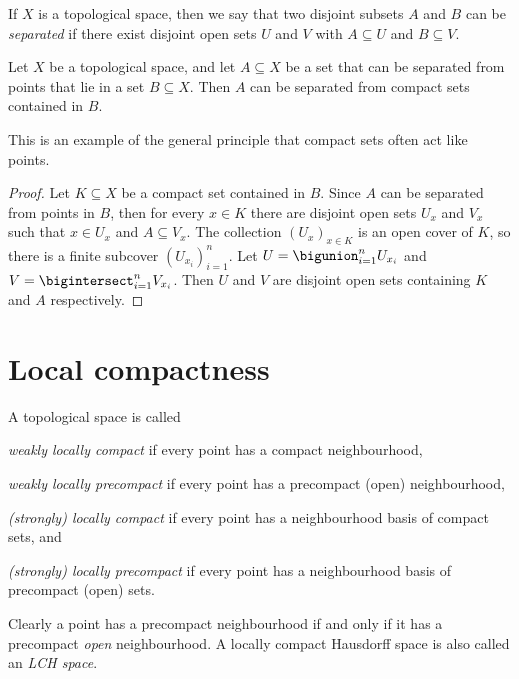 \documentclass[article, a4paper, 11pt, oneside]{memoir}
\numberwithin{equation}{chapter}
\begin{document}
If $X$ is a topological space, then we say that two disjoint subsets $A$ and $B$ can be \emph{separated} if there exist disjoint open sets $U$ and $V$ with $A \subseteq U$ and $B \subseteq V$.

\begin{lemma}
    \label{thm:separating_from_compacts}
    Let $X$ be a topological space, and let $A \subseteq X$ be a set that can be separated from points that lie in a set $B \subseteq X$. Then $A$ can be separated from compact sets contained in $B$.
\end{lemma}
%
This is an example of the general principle that compact sets often act like points.

\begin{proof}
    Let $K \subseteq X$ be a compact set contained in $B$. Since $A$ can be separated from points in $B$, then for every $x \in K$ there are disjoint open sets $U_x$ and $V_x$ such that $x \in U_x$ and $A \subseteq V_x$. The collection $(U_x)_{x \in K}$ is an open cover of $K$, so there is a finite subcover $(U_{x_i})_{i=1}^n$. Let $U = \bigunion_{i=1}^n U_{x_i}$ and $V = \bigintersect_{i=1}^n V_{x_i}$. Then $U$ and $V$ are disjoint open sets containing $K$ and $A$ respectively.
\end{proof}


\section{Local compactness}

\begin{definition}
    \label{def:local-compactness}
    A topological space is called
    \begin{enumdef}
        \item \emph{weakly locally compact} if every point has a compact neighbourhood,
        \item \emph{weakly locally precompact} if every point has a precompact (open) neighbourhood,
        \item \emph{(strongly) locally compact} if every point has a neighbourhood basis of compact sets, and
        \item \emph{(strongly) locally precompact} if every point has a neighbourhood basis of precompact (open) sets.
    \end{enumdef}
\end{definition}
%
Clearly a point has a precompact neighbourhood if and only if it has a precompact \emph{open} neighbourhood. A locally compact Hausdorff space is also called an \emph{LCH space}.
\end{document}
